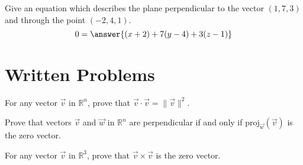 \documentclass{ximera}
\begin{document}
\begin{problem}
Give an equation which describes the plane perpendicular to the vector $(1,7,3)$ and through the point $(-2,4,1)$.
\[
0=\answer{(x+2)+7(y-4)+3(z-1)}
\]
\end{problem}

\section{Written Problems}
\begin{problem}
For any vector $\vec{v}$ in $\mathbb{R}^n$, prove that $\vec{v}\cdot\vec{v}=\|\vec{v}\|^2$.
\end{problem}

\begin{problem}
Prove that vectors $\vec{v}$ and $\vec{w}$ in $\mathbb{R}^n$ are perpendicular if and only if $\textrm{proj}_{\vec{w}}(\vec{v})$ is the zero vector.
\end{problem}

\begin{problem}
For any vector $\vec{v}$ in $\mathbb{R}^3$, prove that $\vec{v}\times\vec{v}$ is the zero vector.
\end{problem}
\end{document}
